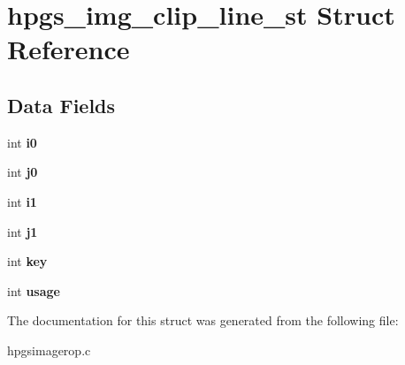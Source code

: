 \section{hpgs\_\-img\_\-clip\_\-line\_\-st Struct Reference}
\label{structhpgs__img__clip__line__st}
\subsection*{Data Fields}
\begin{DoxyCompactItemize}
\item 
int {\bfseries i0}\label{structhpgs__img__clip__line__st_a7d6cfce23e3745be3dad9823ae7f107b}

\item 
int {\bfseries j0}\label{structhpgs__img__clip__line__st_ae29ff183aa8c2a9e19b1785f353a2532}

\item 
int {\bfseries i1}\label{structhpgs__img__clip__line__st_aa99065860deca870c953a9f5cc28fcf4}

\item 
int {\bfseries j1}\label{structhpgs__img__clip__line__st_a6173fc6c92cede091ae0ba8bfaa3634f}

\item 
int {\bfseries key}\label{structhpgs__img__clip__line__st_aadb415875c20a06278af6de140b9d7a8}

\item 
int {\bfseries usage}\label{structhpgs__img__clip__line__st_ad3f331add6582e5d43e2011951712665}

\end{DoxyCompactItemize}


The documentation for this struct was generated from the following file:\begin{DoxyCompactItemize}
\item 
hpgsimagerop.c\end{DoxyCompactItemize}
